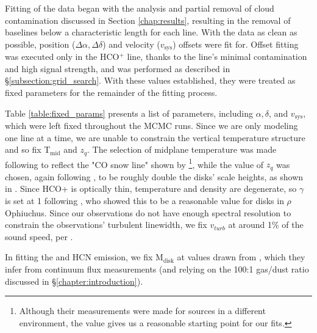 Fitting of the data began with the analysis and partial removal of cloud contamination discussed in Section \ref{chap:results}, resulting in the removal of baselines below a characteristic length for each line. With the data as clean as possible, position ($\Delta \alpha, \Delta \delta$) and velocity ($v_\text{sys}$) offsets were fit for. Offset fitting was executed only in the HCO$^+$ line, thanks to the line's minimal contamination and high signal strength, and was performed as described in \S\ref{subsection:grid_search}. With these values established, they were treated as fixed parameters for the remainder of the fitting process.


Table \ref{table:fixed_params} presents a list of parameters, including $\alpha, \delta$, and $v_\text{sys}$, which were left fixed throughout the MCMC runs. Since we are only modeling one line at a time, we are unable to constrain the vertical temperature structure and so fix T$_\text{mid}$ and $z_q$. The selection of midplane temperature was made following \citet{Factor2017} to reflect the "CO snow line" shown by \citet{Qi2011}\footnote{Although their measurements were made for sources in a different environment, the value gives us a reasonable starting point for our fits.}, while the value of $z_q$ was chosen, again following \citet{Factor2017}, to be roughly double the disks' scale heights, as shown in \citet{Rosenfeld2013}. Since HCO+ is optically thin, temperature and density are degenerate, so $\gamma$ is set at 1 following \cite{Andrews2009}, who showed this to be a reasonable value for disks in $\rho$ Ophiuchus. Since our observations do not have enough spectral resolution to constrain the observations' turbulent linewidth, we fix $v_{turb}$ at around 1\% of the sound speed, per \citet{Williams2014}.

In fitting the \hco and HCN emission, we fix M$_\text{disk}$ at values drawn from \cite{Williams2014}, which they infer from continuum flux measurements (and relying on the 100:1 gas/dust ratio discussed in \S\ref{chapter:introduction}).

